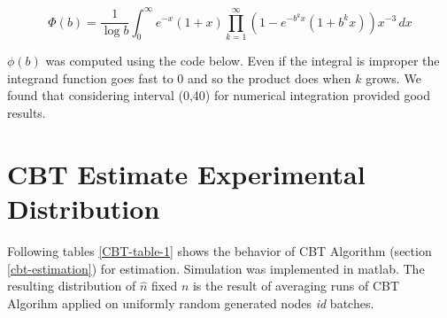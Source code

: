 \begin{appendices}
\begin{equation}
\Phi(b)= \frac{1}{\log b} \int_{0}^{\infty} \! e^{-x}(1+x) \prod_{k=1}^{\infty}(1-e^{-b^{k}x}(1+b^{k}x))x^{-3} \, dx
\label{eq:greenberg-b-Phi}
\end{equation}

\noindent $\phi(b)$ was computed using the code below. Even if the integral is improper the integrand function goes fast to 0 and so the product does when $k$ grows. We found that considering interval (0,40) for numerical integration provided good results.\\






\section{CBT Estimate Experimental Distribution}

Following tables \ref{CBT-table-1} shows the behavior of CBT Algorithm (section \ref{cbt-estimation}) for estimation.  Simulation was implemented in matlab.
The resulting distribution of $\hat{n}$ fixed $n$ is the result of averaging  runs of CBT Algorihm applied on uniformly random generated nodes \emph{id} batches.\\ 

\begin{table}[H]
\caption[Experimentally computed CBT Estimate Distributon]{Experimentally computed CBT Estimate Distributon. Table 1/3}
\label{CBT-table-1}
\end{table}
\end{appendices}
